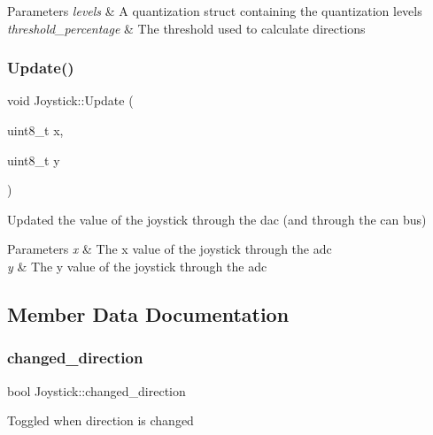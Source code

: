 \begin{DoxyParams}{Parameters}
{\em levels} & A quantization struct containing the quantization levels \\
\hline
{\em threshold\+\_\+percentage} & The threshold used to calculate directions \\
\hline
\end{DoxyParams}
\hypertarget{class_joystick_a07571eca717b70b094f9aa42d90bced7}{}\label{class_joystick_a07571eca717b70b094f9aa42d90bced7} 
\subsubsection{\texorpdfstring{Update()}{Update()}}
{\footnotesize\ttfamily void Joystick\+::\+Update (\begin{DoxyParamCaption}\item[{uint8\+\_\+t}]{x,  }\item[{uint8\+\_\+t}]{y }\end{DoxyParamCaption})}

Updated the value of the joystick through the dac (and through the can bus) 
\begin{DoxyParams}{Parameters}
{\em x} & The x value of the joystick through the adc \\
\hline
{\em y} & The y value of the joystick through the adc \\
\hline
\end{DoxyParams}


\subsection{Member Data Documentation}
\hypertarget{class_joystick_a3e9a785b0764f3b0666e87e77b373b74}{}\label{class_joystick_a3e9a785b0764f3b0666e87e77b373b74} 
\subsubsection{\texorpdfstring{changed\+\_\+direction}{changed\_direction}}
{\footnotesize\ttfamily bool Joystick\+::changed\+\_\+direction\hspace{0.3cm}{\ttfamily [private]}}

Toggled when direction is changed \hypertarget{class_joystick_ae60f2daf5c456900e821b2fde565ef38}{}\label{class_joystick_ae60f2daf5c456900e821b2fde565ef38} 
